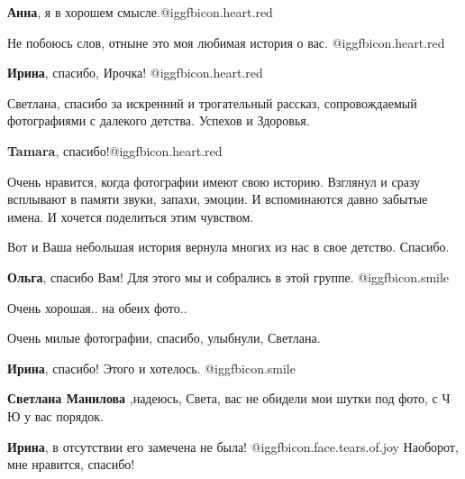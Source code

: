 \begin{itemize}
\begin{itemize}
\textbf{Анна}, я в хорошем смысле.@igg{fbicon.heart.red}
\end{itemize} %

Не побоюсь слов, отныне это моя любимая история о вас. @igg{fbicon.heart.red}

\textbf{Ирина}, спасибо, Ирочка! @igg{fbicon.heart.red}

Светлана, спасибо за искренний и трогательный рассказ, сопровождаемый
фотографиями с далекого детства. Успехов и Здоровья.

\textbf{Tamara}, спасибо!@igg{fbicon.heart.red}


Очень нравится, когда фотографии имеют свою историю. Взглянул и сразу всплывают
в памяти звуки, запахи, эмоции. И вспоминаются давно забытые имена. И хочется
поделиться этим чувством.

Вот и Ваша небольшая история вернула многих из нас в свое детство. Спасибо.

\begin{itemize} %
\textbf{Ольга}, спасибо Вам! Для этого мы и собрались в этой группе. @igg{fbicon.smile} 
\end{itemize} %

Очень хорошая.. на обеих фото..

Очень милые фотографии, спасибо, улыбнули, Светлана.

\begin{itemize} %
\textbf{Ирина}, спасибо! Этого и хотелось. @igg{fbicon.smile} 

\textbf{Светлана Манилова} ,надеюсь, Света, вас не обидели мои шутки под фото, с Ч Ю у вас порядок.

\textbf{Ирина}, в отсутствии его замечена не была! @igg{fbicon.face.tears.of.joy} Наоборот, мне нравится, спасибо!
\end{itemize} %

\end{itemize} %
